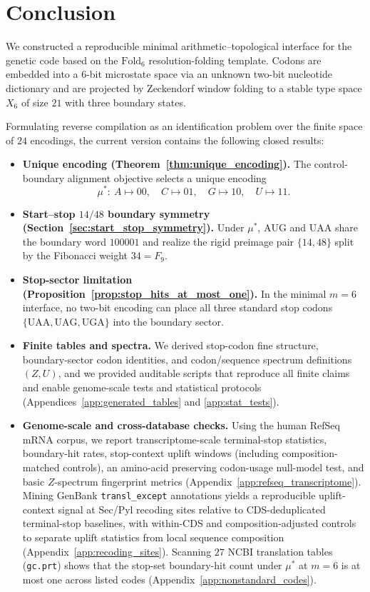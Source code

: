 \section{Conclusion}
\label{sec:conclusion}

We constructed a reproducible minimal arithmetic--topological interface for the genetic code based on the $\mathrm{Fold}_6$ resolution-folding template.
Codons are embedded into a $6$-bit microstate space via an unknown two-bit nucleotide dictionary and are projected by Zeckendorf window folding to a stable type space $X_6$ of size $21$ with three boundary states.

Formulating reverse compilation as an identification problem over the finite space of $24$ encodings, the current version contains the following closed results:
\begin{itemize}
\item \textbf{Unique encoding (Theorem~\ref{thm:unique_encoding}).} The control-boundary alignment objective selects a unique encoding
\[
\mu^\ast:\ A\mapsto 00,\quad C\mapsto 01,\quad G\mapsto 10,\quad U\mapsto 11.
\]
\item \textbf{Start--stop $14/48$ boundary symmetry (Section~\ref{sec:start_stop_symmetry}).} Under $\mu^\ast$, $\mathrm{AUG}$ and $\mathrm{UAA}$ share the boundary word $100001$ and realize the rigid preimage pair $\{14,48\}$ split by the Fibonacci weight $34=F_9$.
\item \textbf{Stop-sector limitation (Proposition~\ref{prop:stop_hits_at_most_one}).} In the minimal $m=6$ interface, no two-bit encoding can place all three standard stop codons $\{\mathrm{UAA,UAG,UGA}\}$ into the boundary sector.
\item \textbf{Finite tables and spectra.} We derived stop-codon fine structure, boundary-sector codon identities, and codon/sequence spectrum definitions $(Z,U)$, and we provided auditable scripts that reproduce all finite claims and enable genome-scale tests and statistical protocols (Appendices~\ref{app:generated_tables} and \ref{app:stat_tests}).
\item \textbf{Genome-scale and cross-database checks.} Using the human RefSeq mRNA corpus, we report transcriptome-scale terminal-stop statistics, boundary-hit rates, stop-context uplift windows (including composition-matched controls), an amino-acid preserving codon-usage null-model test, and basic $Z$-spectrum fingerprint metrics (Appendix~\ref{app:refseq_transcriptome}). Mining GenBank \texttt{transl\_except} annotations yields a reproducible uplift-context signal at Sec/Pyl recoding sites relative to CDS-deduplicated terminal-stop baselines, with within-CDS and composition-adjusted controls to separate uplift statistics from local sequence composition (Appendix~\ref{app:recoding_sites}). Scanning $27$ NCBI translation tables (\texttt{gc.prt}) shows that the stop-set boundary-hit count under $\mu^\ast$ at $m=6$ is at most one across listed codes (Appendix~\ref{app:nonstandard_codes}).

\end{itemize}
